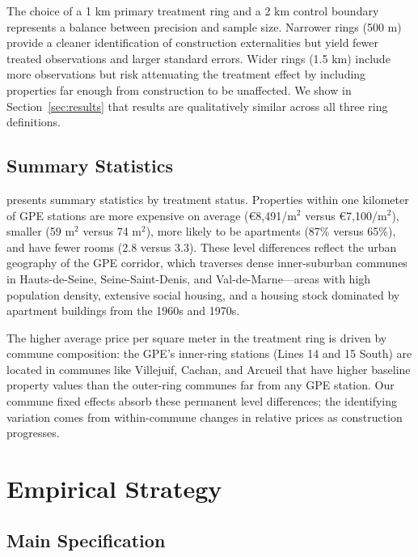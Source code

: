 \documentclass[12pt]{article}
\begin{document}
The choice of a 1 km primary treatment ring and a 2 km control boundary represents a balance between precision and sample size. Narrower rings (500 m) provide a cleaner identification of construction externalities but yield fewer treated observations and larger standard errors. Wider rings (1.5 km) include more observations but risk attenuating the treatment effect by including properties far enough from construction to be unaffected. We show in Section~\ref{sec:results} that results are qualitatively similar across all three ring definitions.

\subsection{Summary Statistics}

 presents summary statistics by treatment status. Properties within one kilometer of GPE stations are more expensive on average (\euro8,491/m$^2$ versus \euro7,100/m$^2$), smaller (59 m$^2$ versus 74 m$^2$), more likely to be apartments (87\% versus 65\%), and have fewer rooms (2.8 versus 3.3). These level differences reflect the urban geography of the GPE corridor, which traverses dense inner-suburban communes in Hauts-de-Seine, Seine-Saint-Denis, and Val-de-Marne---areas with high population density, extensive social housing, and a housing stock dominated by apartment buildings from the 1960s and 1970s.

The higher average price per square meter in the treatment ring is driven by commune composition: the GPE's inner-ring stations (Lines 14 and 15 South) are located in communes like Villejuif, Cachan, and Arcueil that have higher baseline property values than the outer-ring communes far from any GPE station. Our commune fixed effects absorb these permanent level differences; the identifying variation comes from within-commune changes in relative prices as construction progresses.




\section{Empirical Strategy}
\label{sec:strategy}

\subsection{Main Specification}
\end{document}
